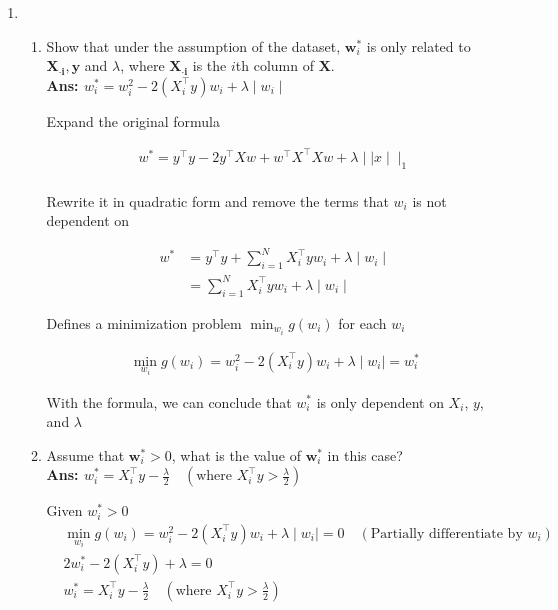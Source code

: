 \documentclass{article}
\theoremstyle{definition}
\theoremstyle{remark}
\begin{document}
\begin{enumerate}[font={\Large\bfseries},left=0pt]
\begin{tcolorbox}
\begin{enumerate}
			\item \begin{enumerate}
				      \item Show that under the assumption of the dataset, $\bm{w}^*_i$ is only related to $\bm{X_{\cdot i}}, \bm{y}$ and $\lambda$, where $\bm{X_{\cdot i}}$ is the $i$th column of $\bm{X}$.\\
				            \textbf{Ans: $w_i^* = w_i^2 - 2(X^\intercal_i y)w_i + \lambda \mid w_i \mid$}

				            Expand the original formula

				            \begin{align}
					            w^* = y^\intercal y - 2y^\intercal Xw + w^\intercal X^\intercal X w + \lambda \mid\mid x \mid\mid_1 \\
				            \end{align}

				            Rewrite it in quadratic form and remove the terms that $w_i$ is not dependent on

				            \begin{align}
					            w^* & = y^\intercal y + \sum^N_{i = 1} X_i^\intercal yw_i + \lambda \mid w_i \mid \\
					                & = \sum^N_{i = 1} X_i^\intercal yw_i + \lambda \mid w_i \mid
				            \end{align}

				            Defines a minimization problem $\min_{w_i} g(w_i)$ for each $w_i$

				            \begin{align}
					            \min_{w_i} g(w_i) = w_i^2 - 2(X^\intercal_i y)w_i + \lambda \mid w_i \mid = w_i^*
				            \end{align}

				            With the formula, we can conclude that $w_i^*$ is only dependent on $X_i$, $y$, and $\lambda$


				      \item Assume that $\bm{w}^*_i>0$, what is the value of $\bm{w}^*_i$ in this case? \\
				            \textbf{Ans: $w_i^* = X^\intercal_i y - \frac{\lambda}{2} \quad (\text{where } X_i^\intercal y> \frac{\lambda}{2})$}

				            Given $w_i^* > 0$
				            \begin{align}
					             & \min_{w_i} g(w_i)  = w_i^2 - 2(X^\intercal_i y)w_i + \lambda \mid w_i \mid = 0 \quad (\text{Partially differentiate by } w_i) \\
					             & 2w_i^* - 2(X^\intercal_i y) + \lambda = 0                                                                                     \\
					             & w_i^* = X^\intercal_i y - \frac{\lambda}{2}\quad (\text{where } X_i^\intercal y> \frac{\lambda}{2})                           \\
				            \end{align}


\end{enumerate}
\end{enumerate}
\end{tcolorbox}
\end{enumerate}
\end{document}
